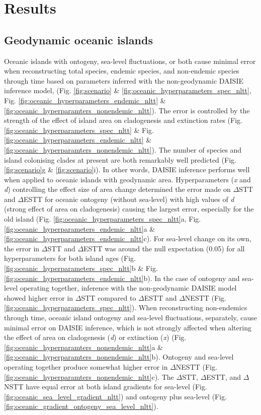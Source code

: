 \documentclass{article}
\begin{document}
\clearpage

\section*{Results}

\subsection*{Geodynamic oceanic islands}

Oceanic islands with ontogeny, sea-level fluctuations, or both cause minimal error when reconstructing total species, endemic species, and non-endemic species through time based on parameters inferred with the non-geodynamic DAISIE inference model, (Fig. \ref{fig:scenario} \& \ref{fig:oceanic_hyperparameters_spec_nltt}, Fig. \ref{fig:oceanic_hyperparameters_endemic_nltt} \& \ref{fig:oceanic_hyperparamters_nonendemic_nltt}). The error is controlled by the strength of the effect of island area on cladogenesis and extinction rates (Fig. \ref{fig:oceanic_hyperparameters_spec_nltt} \& Fig. \ref{fig:oceanic_hyperparameters_endemic_nltt} \& \ref{fig:oceanic_hyperparamters_nonendemic_nltt}). The number of species and island colonising clades at present are both remarkably well predicted (Fig. \ref{fig:scenario}g \& \ref{fig:scenario}i). In other words, DAISIE inference performs well when applied to oceanic islands with geodynamic area. Hyperparameters (\textit{x} and \textit{d}) controlling the effect size of area change determined the error made on $\Delta$STT and $\Delta$ESTT for oceanic ontogeny (without sea-level) with high values of \textit{d} (strong effect of area on cladogenesis) causing the largest error, especially for the old island (Fig. \ref{fig:oceanic_hyperparameters_spec_nltt}a, Fig. \ref{fig:oceanic_hyperparameters_endemic_nltt}a \& \ref{fig:oceanic_hyperparameters_endemic_nltt}c). For sea-level change on its own, the error in $\Delta$STT and $\Delta$ESTT was around the null expectation (0.05) for all hyperparameters for both island ages (Fig. \ref{fig:oceanic_hyperparameters_spec_nltt}b \& Fig. \ref{fig:oceanic_hyperparameters_endemic_nltt}b). In the case of ontogeny and sea-level operating together, inference with the non-geodynamic DAISIE model showed higher error in $\Delta$STT compared to $\Delta$ESTT and $\Delta$NESTT (Fig. \ref{fig:oceanic_hyperparameters_spec_nltt}). When reconstructing non-endemics through time, oceanic island ontogeny and sea-level fluctuations, separately, cause minimal error on DAISIE inference, which is not strongly affected when altering the effect of area on cladogenesis (\textit{d}) or extinction (\textit{x}) (Fig. \ref{fig:oceanic_hyperparamters_nonendemic_nltt}a \& \ref{fig:oceanic_hyperparamters_nonendemic_nltt}b). Ontogeny and sea-level operating together produce somewhat higher error in $\Delta$NESTT (Fig. \ref{fig:oceanic_hyperparamters_nonendemic_nltt}c). The $\Delta$STT, $\Delta$ESTT, and $\Delta$NSTT have equal error at both island gradients for sea-level (Fig. \ref{fig:oceanic_sea_level_gradient_nltt}) and ontogeny plus sea-level (Fig. \ref{fig:oceanic_gradient_ontogeny_sea_level_nltt}). \\
\end{document}
